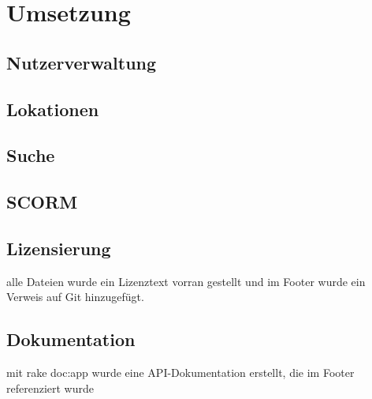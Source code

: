 \chapter{Umsetzung}\label{ref:chaptImplementation}

\section{Nutzerverwaltung}

\section{Lokationen}

\section{Suche}

\section{SCORM}

\section{Lizensierung}
\begin{k}
alle Dateien wurde ein Lizenztext vorran gestellt und im Footer wurde ein
Verweis auf Git hinzugefügt.
\end{k}

\section{Dokumentation}
\begin{k}
mit rake doc:app wurde eine API-Dokumentation erstellt, die im Footer
referenziert wurde
\end{k}